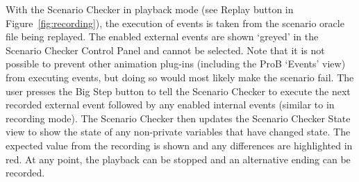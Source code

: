 With the Scenario Checker in playback mode (see Replay button in Figure~\ref{fig:recording}), the execution of events is taken from the scenario oracle file being replayed.
The enabled external events are shown `greyed' in the Scenario Checker Control Panel and cannot be selected.
Note that it is not possible to prevent other animation plug-ins (including the ProB `Events' view) from executing events, but doing so would most likely make the scenario fail. 
The user presses the Big Step button to tell the Scenario Checker to execute the next recorded external event followed by any enabled internal events (similar to in recording mode).
The Scenario Checker then updates the Scenario Checker State view to show the state of any non-private variables that have changed state.
The expected value from the recording is shown and any differences are highlighted in red.
At any point, the playback can be stopped and an alternative ending can be recorded.

